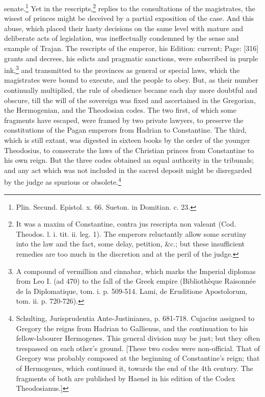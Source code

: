 senate.\footnote{Plin. Secund. Epistol. x. 66. Sueton. in Domitian. c. 23.} Yet in the rescripts,\footnote{It was a maxim of Constantine, contra jus rescripta non valeant (Cod. Theodos. l. i. tit. ii. leg. 1). The emperors reluctantly allow some scrutiny into the law and the fact, some delay, petition, \&c.; but these insufficient remedies are too much in the discretion and at the peril of the judge.} replies to the consultations of the magistrates, the wisest of princes might be deceived by a partial exposition of the case. And this abuse, which placed their hasty decisions on the same level with mature and deliberate acts of legislation, was ineffectually condemned by the sense and example of Trajan. The rescripts of the emperor, his Edition: current; Page: [316] grants and decrees, his edicts and pragmatic sanctions, were subscribed in purple ink,\footnote{A compound of vermillion and cinnabar, which marks the Imperial diplomas from Leo I. (ad 470) to the fall of the Greek empire (Bibliothèque Raisonnée de la Diplomatique, tom. i. p. 509-514. Lami, de Eruditione Apostolorum, tom. ii. p. 720-726).} and transmitted to the provinces as general or special laws, which the magistrates were bound to execute, and the people to obey. But, as their number continually multiplied, the rule of obedience became each day more doubtful and obscure, till the will of the sovereign was fixed and ascertained in the Gregorian, the Hermogenian, and the Theodosian codes. The two first, of which some fragments have escaped, were framed by two private lawyers, to preserve the constitutions of the Pagan emperors from Hadrian to Constantine. The third, which is still extant, was digested in sixteen books by the order of the younger Theodosius, to consecrate the laws of the Christian princes from Constantine to his own reign. But the three codes obtained an equal authority in the tribunals; and any act which was not included in the sacred deposit might be disregarded by the judge as spurious or obsolete.\footnote{Schulting, Jurisprudentia Ante-Justinianea, p. 681-718. Cujacius assigned to Gregory the reigns from Hadrian to Gallienus, and the continuation to his fellow-labourer Hermogenes. This general division may be just; but they often trespassed on each other\texthebrew{}’s ground. [These two codes were non-official. That of Gregory was probably composed at the beginning of Constantine\texthebrew{}’s reign; that of Hermogenes, which continued it, towards the end of the 4th century. The fragments of both are published by Haenel in his edition of the Codex Theodosianus.]}

